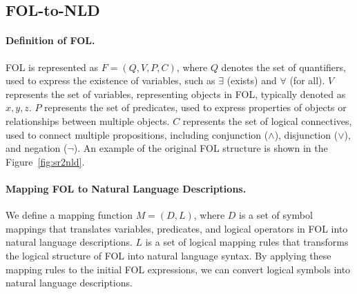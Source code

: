 \subsection{FOL-to-NLD}
\paragraph{Definition of FOL.}
    FOL is represented as \( F = (Q, V, P, C) \), where 
         \( Q \) denotes the set of quantifiers, used to express the existence of variables, such as \( \exists \) (exists) and \( \forall \) (for all).
         \( V \) represents the set of variables, representing objects in FOL, typically denoted as \( x, y, z \).
         \( P \) represents the set of predicates, used to express properties of objects or relationships between multiple objects.
         \( C \) represents the set of logical connectives, used to connect multiple propositions, including conjunction (\( \land \)), disjunction (\( \lor \)), and negation (\( \neg \)).
    An example of the original FOL structure is shown in the Figure~\ref{fig:sr2nld}.

\paragraph{Mapping FOL to Natural Language Descriptions.}
    We define a mapping function \( M = (D, L) \), where
         \( D \) is a set of symbol mappings that translates variables, predicates, and logical operators in FOL into natural language descriptions.
         \( L \) is a set of logical mapping rules that transforms the logical structure of FOL into natural language syntax.
    By applying these mapping rules to the initial FOL expressions, we can convert logical symbols into natural language descriptions.
    
